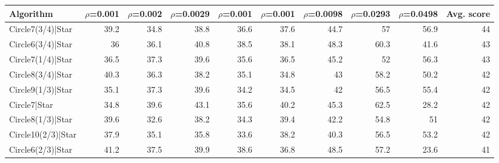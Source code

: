 \begin{tabular}{lrrrrrrrrr}
\hline
 Algorithm                                                &   $\rho$=0.001 &   $\rho$=0.002 &   $\rho$=0.0029 &   $\rho$=0.001 &   $\rho$=0.001 &   $\rho$=0.0098 &   $\rho$=0.0293 &   $\rho$=0.0498 &   Avg. score \\
\hline
 Circle7(3/4)|Star                                        &           39.2 &           34.8 &            38.8 &           36.6 &           37.6 &            44.7 &            57   &            56.9 &           44 \\
 Circle6(3/4)|Star                                        &           36   &           36.1 &            40.8 &           38.5 &           38.1 &            48.3 &            60.3 &            41.6 &           43 \\
 Circle7(1/4)|Star                                        &           36.5 &           37.3 &            39.6 &           35.6 &           36.5 &            45.2 &            52   &            56.3 &           43 \\
 Circle8(3/4)|Star                                        &           40.3 &           36.3 &            38.2 &           35.1 &           34.8 &            43   &            58.2 &            50.2 &           42 \\
 Circle9(1/3)|Star                                        &           35.1 &           37.3 &            39.6 &           34.2 &           34.5 &            42   &            56.5 &            55.4 &           42 \\
 Circle7|Star                                             &           34.8 &           39.6 &            43.1 &           35.6 &           40.2 &            45.3 &            62.5 &            28.2 &           42 \\
 Circle8(1/3)|Star                                        &           39.6 &           32.6 &            38.2 &           34.3 &           39.4 &            42.2 &            54.8 &            51   &           42 \\
 Circle10(2/3)|Star                                       &           37.9 &           35.1 &            35.8 &           33.6 &           38.2 &            40.3 &            56.5 &            53.2 &           42 \\
 Circle6(2/3)|Star                                        &           41.2 &           37.5 &            39.9 &           38.6 &           36.8 &            48.5 &            57.2 &            23.6 &           41 \\

\end{tabular}
